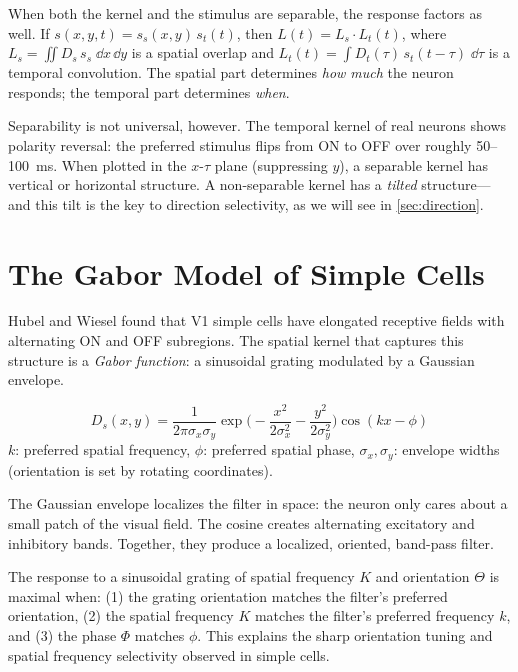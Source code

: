 When both the kernel and the stimulus are separable, the response factors as well. If $s(x, y, t) = s_s(x, y)\,s_t(t)$, then $L(t) = L_s \cdot L_t(t)$, where $L_s = \iint D_s\, s_s\;\dd x\,\dd y$ is a spatial overlap and $L_t(t) = \int D_t(\tau)\,s_t(t - \tau)\;\dd\tau$ is a temporal convolution. The spatial part determines \emph{how much} the neuron responds; the temporal part determines \emph{when}.

Separability is not universal, however. The temporal kernel of real neurons shows polarity reversal: the preferred stimulus flips from ON to OFF over roughly 50--100~ms. When plotted in the $x$-$\tau$ plane (suppressing $y$), a separable kernel has vertical or horizontal structure. A non-separable kernel has a \emph{tilted} structure---and this tilt is the key to direction selectivity, as we will see in \cref{sec:direction}.

\section{The Gabor Model of Simple Cells}
\label{sec:gabor}

Hubel and Wiesel found that V1 simple cells have elongated receptive fields with alternating ON and OFF subregions. The spatial kernel that captures this structure is a \emph{Gabor function}: a sinusoidal grating modulated by a Gaussian envelope.

\begin{keyequation}
\begin{equation}
  D_s(x, y) = \frac{1}{2\pi\sigma_x\sigma_y}
    \exp\!\biggl(-\frac{x^2}{2\sigma_x^2} - \frac{y^2}{2\sigma_y^2}\biggr)
    \cos(kx - \phi)
  \label{eq:gabor}
\end{equation}
\tcblower
$k$: preferred spatial frequency, \quad
$\phi$: preferred spatial phase, \quad
$\sigma_x, \sigma_y$: envelope widths (orientation is set by rotating coordinates).
\end{keyequation}

\noindent The Gaussian envelope localizes the filter in space: the neuron only cares about a small patch of the visual field. The cosine creates alternating excitatory and inhibitory bands. Together, they produce a localized, oriented, band-pass filter.

The response to a sinusoidal grating of spatial frequency $K$ and orientation $\Theta$ is maximal when: (1) the grating orientation matches the filter's preferred orientation, (2) the spatial frequency $K$ matches the filter's preferred frequency $k$, and (3) the phase $\Phi$ matches $\phi$. This explains the sharp orientation tuning and spatial frequency selectivity observed in simple cells.

